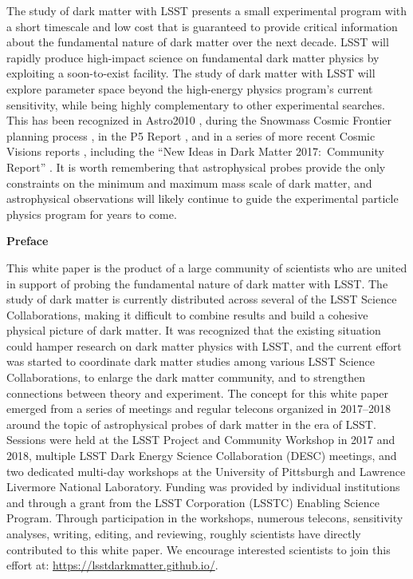 The study of dark matter with LSST presents a small experimental program with a short timescale and low cost that is guaranteed to provide critical information about the fundamental nature of dark matter over the next decade.
LSST will rapidly produce high-impact science on fundamental dark matter physics by exploiting a soon-to-exist facility. 
The study of dark matter with LSST will explore parameter space beyond the high-energy physics program's current sensitivity, while being highly complementary to other experimental searches. %
This has been recognized in Astro2010 \citep{Astro2010}, during the Snowmass Cosmic Frontier planning process \citep[\eg,][]{1310.8642, 1310.5662, 1305.1605}, in the P5 Report \citep[]{P5Report}, and in a series of more recent Cosmic Visions reports \citep[\eg,][]{1604.07626,1802.07216}, including the ``New Ideas in Dark Matter 2017:\ Community Report'' \citep{Battaglieri:2017aum}.
It is worth remembering that astrophysical probes provide the only constraints on the minimum and maximum mass scale of dark matter, and astrophysical observations will likely continue to guide the experimental particle physics program for years to come.

\clearpage

\begin{center}
  {\Large \bf Preface}
\end{center}

This white paper is the product of a large community of scientists who are united in support of probing the fundamental nature of dark matter with LSST.
The study of dark matter is currently distributed across several of the LSST Science Collaborations, making it difficult to combine results and build a cohesive physical picture of dark matter.
It was recognized that the existing situation could hamper research on dark matter physics with LSST, and the current effort was started to coordinate dark matter studies among various LSST Science Collaborations, to enlarge the dark matter community, and to strengthen connections between theory and experiment.
The concept for this white paper emerged from a series of meetings and regular telecons organized in 2017--2018 around the topic of astrophysical probes of dark matter in the era of LSST.
Sessions were held at the LSST Project and Community Workshop in 2017 and 2018, multiple LSST Dark Energy Science Collaboration (DESC) meetings, and two dedicated multi-day workshops at the University of Pittsburgh and Lawrence Livermore National Laboratory.
Funding was provided by individual institutions and through a grant from the LSST Corporation (LSSTC) Enabling Science Program.
Through participation in the workshops, numerous telecons, sensitivity analyses, writing, editing, and reviewing, roughly  scientists have directly contributed to this white paper.
We encourage interested scientists to join this effort at: \url{https://lsstdarkmatter.github.io/}.
